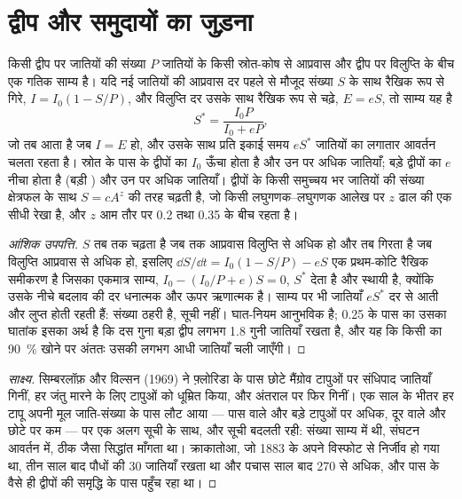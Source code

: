 \section{द्वीप और समुदायों का जुड़ना}

\begin{theorem}[द्वीप जैवभूगोल का साम्य सिद्धांत]\label{thm:b1:ecosystem-dynamics:island}
किसी द्वीप पर जातियों की संख्या $P$ जातियों के किसी स्रोत-कोष से
आप्रवास और द्वीप पर विलुप्ति के बीच एक गतिक साम्य है। यदि नई जातियों की
आप्रवास दर पहले से मौजूद संख्या $S$ के साथ रैखिक रूप से गिरे,
$I = I_0(1 - S/P)$, और विलुप्ति दर उसके साथ रैखिक रूप से चढ़े, $E = eS$,
तो साम्य यह है
\[
S^* = \frac{I_0 P}{I_0 + eP} ,
\]
जो तब आता है जब $I = E$ हो, और उसके साथ प्रति इकाई समय $eS^*$ जातियों का
लगातार आवर्तन चलता रहता है। स्रोत के पास के द्वीपों का $I_0$ ऊँचा होता है
और उन पर अधिक जातियाँ; बड़े द्वीपों का $e$ नीचा होता है (बड़ी )
और उन पर अधिक जातियाँ। द्वीपों के किसी समुच्चय भर जातियों की संख्या
क्षेत्रफल के साथ $S = cA^z$ की तरह चढ़ती है, जो किसी लघुगणक--लघुगणक आलेख
पर $z$ ढाल की एक सीधी रेखा है, और $z$ आम तौर पर \num{0.2} तथा \num{0.35}
के बीच रहता है।
\end{theorem}
\begin{proof}[आंशिक उपपत्ति]
$S$ तब तक चढ़ता है जब तक आप्रवास विलुप्ति से अधिक हो और तब गिरता है जब
विलुप्ति आप्रवास से अधिक हो, इसलिए $\dd S/\dd t = I_0(1 - S/P) - eS$
एक प्रथम-कोटि रैखिक समीकरण है जिसका एकमात्र साम्य, $I_0 -
(I_0/P + e)S = 0$, $S^*$ देता है और स्थायी है, क्योंकि उसके नीचे बदलाव की
दर धनात्मक और ऊपर ऋणात्मक है। साम्य पर भी जातियाँ $eS^*$ दर से आती और
लुप्त होती रहती हैं: संख्या ठहरी है, सूची नहीं। घात-नियम आनुभविक है;
\num{0.25} के पास का उसका घातांक इसका अर्थ है कि दस गुना बड़ा द्वीप लगभग
\num{1.8} गुनी जातियाँ रखता है, और यह कि किसी  का \qty{90}{\%} खोने
पर अंततः उसकी लगभग आधी जातियाँ चली जाएँगी।
\end{proof}
\begin{proof}[साक्ष्य]
सिम्बरलॉफ़ और विल्सन (1969) ने फ़्लोरिडा के पास छोटे मैंग्रोव टापुओं पर
संधिपाद जातियाँ गिनीं, हर जंतु मारने के लिए टापुओं को धूम्रित किया, और
अंतराल पर फिर गिनीं। एक साल के भीतर हर टापू अपनी मूल जाति-संख्या के पास
लौट आया --- पास वाले और बड़े टापुओं पर अधिक, दूर वाले और छोटे पर कम ---
पर एक अलग सूची के साथ, और सूची बदलती रही: संख्या साम्य में थी, संघटन
आवर्तन में, ठीक जैसा सिद्धांत माँगता था। क्राकातोआ, जो 1883 के अपने
विस्फोट से निर्जीव हो गया था, तीन साल बाद पौधों की \num{30} जातियाँ रखता
था और पचास साल बाद \num{270} से अधिक, और पास के वैसे ही द्वीपों की
समृद्धि के पास पहुँच रहा था।
\end{proof}

